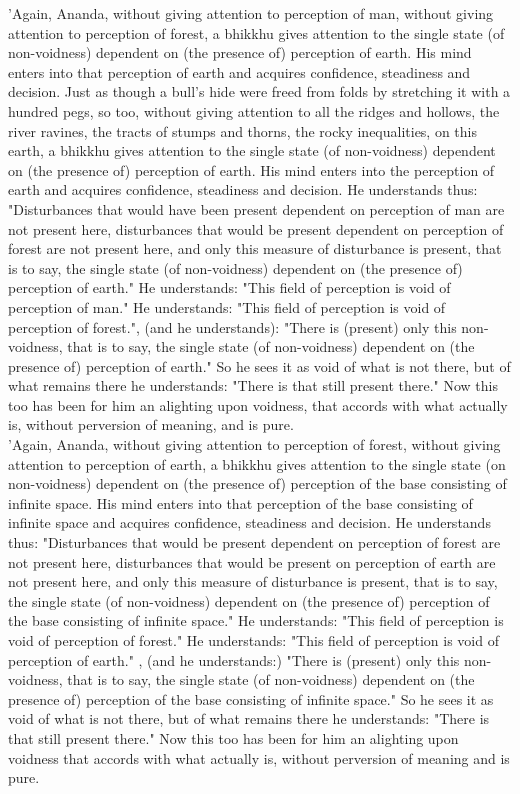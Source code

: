\documentclass[11pt]{article}
\begin{document}
 'Again, Ananda, without giving attention to perception of man, without giving attention to perception of forest, a bhikkhu gives attention to the single state (of non-voidness) dependent on (the presence of) perception of earth. His mind enters into that perception of earth and acquires confidence, steadiness and decision. Just as though a bull's hide were freed from folds by stretching it with a hundred pegs, so too, without giving attention to all the ridges and hollows, the river ravines, the tracts of stumps and thorns, the rocky inequalities, on this earth, a bhikkhu gives attention to the single state (of non-voidness) dependent on (the presence of) perception of earth. His mind enters into the perception of earth and acquires confidence, steadiness and decision. He understands thus: "Disturbances that would have been present dependent on perception of man are not present here, disturbances that would be present dependent on perception of forest are not present here, and only this measure of disturbance is present, that is to say, the single state (of non-voidness) dependent on (the presence of) perception of earth." He understands: "This field of perception is void of perception of man." He understands: "This field of perception is void of perception of forest.", (and he understands): "There is (present) only this non-voidness, that is to say, the single state (of non-voidness) dependent on (the presence of) perception of earth." So he sees it as void of what is not there, but of what remains there he understands: "There is that still present there." Now this too has been for him an alighting upon voidness, that accords with what actually is, without perversion of meaning, and is pure.\\

 'Again, Ananda, without giving attention to perception of forest, without giving attention to perception of earth, a bhikkhu gives attention to the single state (on non-voidness) dependent on (the presence of) perception of the base consisting of infinite space. His mind enters into that perception of the base consisting of infinite space and acquires confidence, steadiness and decision. He understands thus: "Disturbances that would be present dependent on perception of forest are not present here, disturbances that would be present on perception of earth are not present here, and only this measure of disturbance is present, that is to say, the single state (of non-voidness) dependent on (the presence of) perception of the base consisting of infinite space." He understands: "This field of perception is void of perception of forest." He understands: "This field of perception is void of perception of earth." , (and he understands:) "There is (present) only this non-voidness, that is to say, the single state (of non-voidness) dependent on (the presence of) perception of the base consisting of infinite space." So he sees it as void of what is not there, but of what remains there he understands: "There is that still present there." Now this too has been for him an alighting upon voidness that accords with what actually is, without perversion of meaning and is pure.\\
\end{document}
